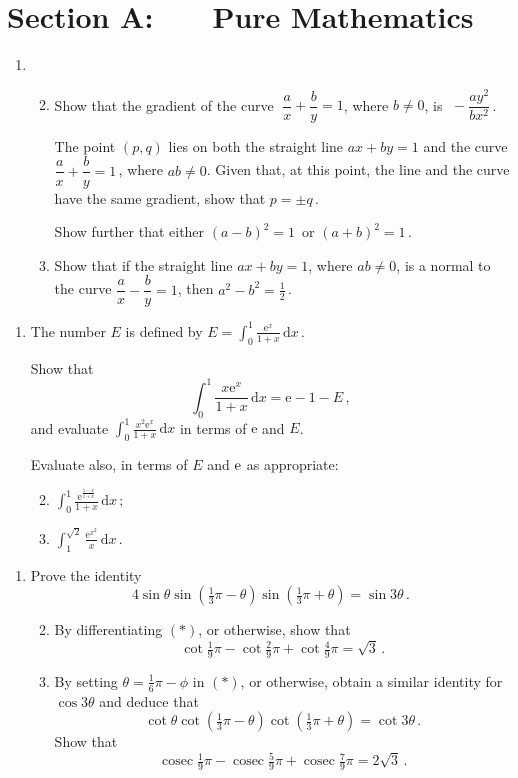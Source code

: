 \documentclass[a4, 11pt]{report}
\newlength{\qspace}
\newcounter{qnumber}
\newenvironment{question}%
 {\vspace{\qspace}
  \begin{enumerate}[\bfseries 1\quad][10]%
    \setcounter{enumi}{\value{qnumber}}%
    \item%
 }
{
  \end{enumerate}
  \filbreak
  \stepcounter{qnumber}
 }
\newenvironment{questionparts}[1][1]%
 {
  \begin{enumerate}[\bfseries (i)]%
    \setcounter{enumii}{#1}
    \addtocounter{enumii}{-1}
    \setlength{\itemsep}{5mm}
    \setlength{\parskip}{8pt}
 }
 {
  \end{enumerate}
 }
\DeclareMathOperator{\cosec}{cosec}
\def\d{{\mathrm d}}
\def\e{{\mathrm e}}
\begin{document}
\setcounter{page}{2}

 
\section*{Section A: \ \ \ Pure Mathematics}

\begin{question}
\begin{questionparts}
\item Show that the gradient of the curve
 $\; \dfrac a x + \dfrac by =1$, where $b\ne0$, 
 is $\; -\dfrac{ay^2}{bx^2}\,$.

The point $(p,q)$ lies on both the straight line 
$ax+by=1$ and the curve $\dfrac a x + \dfrac by =1\,$, 
where $ab\ne0$.
Given that, at this point, the line and the curve have the
same gradient, show that $ p=\pm q\,$. 

Show further that
either $
(a-b)^2 =1\,$ or $(a+b)^2 =1\,$.

\item Show that if the straight line 
$ax+by=1$, where $ab\ne0$,
is a normal to 
the curve $\dfrac a x - \dfrac by =1$, then 
$a^2-b^2 = \frac12\,$.

\end{questionparts}
\end{question}

\begin{question}
The number $E$ is defined by
$\displaystyle 
E= \int_0^1 \frac{\e^x}{1+x} \, \d x\,.$

Show that 
\[
\int_0^1 \frac{x \e^x}{1+x} \, \d x = \e -1 -E\,
,\]
and evaluate $\displaystyle \int_0^1 \frac{x^2\e^x}{1+x} \, \d x$
in terms of $\e$ and $E$.

Evaluate also, in terms of $E$ and $\rm e$ as appropriate:
\begin{questionparts}
\item 
$\displaystyle
\int_0^1
\frac{\e^{\frac{1-x}{1+x}}}{1+x}\, \d x\,;
$
\item
$\displaystyle 
\int_1^{\sqrt2} \frac {\e^{x^2}}x \, \d x \, $.
\end{questionparts}

\end{question}

\begin{question}
Prove the identity
\[
4\sin\theta \sin(\tfrac13\pi-\theta) \sin (\tfrac13\pi+\theta)= 
\sin 3\theta\,
.
\tag{$*$}\]

\begin{questionparts}
\item By differentiating $(*)$, or otherwise, show that
\[
 \cot \tfrac19\pi  - \cot \tfrac29\pi + \cot \tfrac49\pi = \sqrt3\,.
\]
\item
By setting $\theta = \frac16\pi-\phi$ in $(*)$, or otherwise,
obtain  a similar identity for $\cos3\theta$ and deduce that
\[
\cot \theta \cot (\tfrac13\pi-\theta) \cot (\tfrac13\pi+\theta) =\cot3\theta\,.
\]
Show that
\[
\cosec \tfrac19\pi  -\cosec \tfrac59\pi +\cosec \tfrac79\pi = 2\sqrt3\,.
\]

\end{questionparts}
\end{question}
\end{document}
